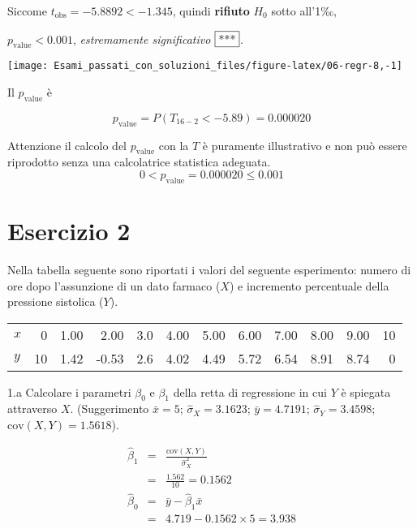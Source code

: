 \documentclass[
  11pt,
]{book}
\theoremstyle{mytheoremstyle}
\theoremstyle{mydefstyle}
\newenvironment{sol}
  {
  \begin{tcolorbox}[enhanced,breakable,arc=0.1mm,boxrule=1pt,colback=white,colframe=iblue,
  title=\bf \fontfamily{lmss}\selectfont \hspace{.5 cm} Soluzione,drop fuzzy shadow]

}{
\end{tcolorbox}
  }
\begin{document}
\begin{sol}
Siccome \(t_\text{obs}=-5.8892<-1.345\), quindi \textbf{rifiuto} \(H_0\) sotto all'1‰,

\(p_\text{value}<0.001\), \emph{estremamente significativo} \(\fbox{***}\).

\begin{center}\texttt{[image: Esami\_passati\_con\_soluzioni\_files/figure-latex/06-regr-8,-1]} \end{center}

Il \(p_{\text{value}}\) è

\[ p_{\text{value}} = P(T_{16-2}<-5.89)=0.000020 \]

Attenzione il calcolo del \(p_\text{value}\) con la \(T\) è puramente illustrativo e non può essere riprodotto senza una calcolatrice statistica adeguata.\[
 0 < p_\text{value}= 0.000020 \leq 0.001 
\]

\end{sol}

\section{Esercizio 2}\label{esercizio-2-3}

Nella tabella seguente sono riportati i valori del seguente
esperimento: numero di ore dopo l'assunzione di un dato farmaco
(\(X\)) e incremento percentuale della pressione sistolica (\(Y\)).

\begin{table}[H]
\centering
\begin{tabular}{lrrrrrrrrrrr}
\toprule
$x$ & 0 & 1.00 & 2.00 & 3.0 & 4.00 & 5.00 & 6.00 & 7.00 & 8.00 & 9.00 & 10\\
$y$ & 10 & 1.42 & -0.53 & 2.6 & 4.02 & 4.49 & 5.72 & 6.54 & 8.91 & 8.74 & 0\\
\bottomrule
\end{tabular}
\end{table}

1.a Calcolare i parametri \(\beta_{0}\) e \(\beta_{1}\)
della retta di regressione in cui \(Y\) è spiegata attraverso \(X\).
(Suggerimento \(\bar{x} = 5\); \(\hat\sigma_{X} = 3.1623\);
\(\bar{y} = 4.7191\); \(\hat\sigma_{Y} = 3.4598\); \(\text{cov}(X,Y)= 1.5618\)).

\begin{sol}
\begin{eqnarray*}
       \hat\beta_1 &=& \frac{\text{cov}(X,Y)}{\hat\sigma_X^2} \\
            &=& \frac{ 1.562 }{ 10 }  =  0.1562 \\
      \hat\beta_0 &=& \bar y - \hat\beta_1 \bar x\\
          &=&  4.719 - 0.1562 \times  5 = 3.938 
      \end{eqnarray*}

\end{sol}
\end{document}
